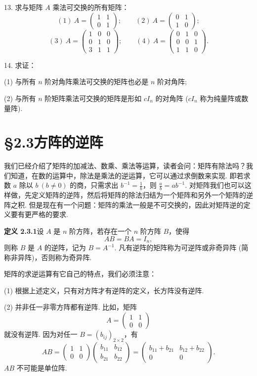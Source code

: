 \documentclass[UTF8, 12pt, fontset=fandol, oneside]{ctexart}
\begin{document}
13. 求与矩阵 $A$ 乘法可交换的所有矩阵：
\[
(1)\ A=\left(\begin{array}{cc}
1 & 1\\
0 & 1
\end{array}\right);
\qquad
(2)\ A=\left(\begin{array}{cc}
0 & 1\\
1 & 0
\end{array}\right);
\]
\[
(3)\ A=\left(\begin{array}{ccc}
1 & 0 & 0\\
0 & 1 & 0\\
3 & 1 & 1
\end{array}\right);
\qquad
(4)\ A=\left(\begin{array}{ccc}
0 & 1 & 0\\
0 & 0 & 1\\
1 & 1 & 0
\end{array}\right).
\]

14. 求证：

(1) 与所有 $n$ 阶对角阵乘法可交换的矩阵也必是 $n$ 阶对角阵;

(2) 与所有 $n$ 阶矩阵乘法可交换的矩阵是形如 $cI_n$ 的对角阵 ($cI_n$ 称为纯量阵或数量阵).

\section*{§2.3\quad 方阵的逆阵}

我们已经介绍了矩阵的加减法、数乘、乘法等运算，读者会问：矩阵有除法吗？我们知道，在数的运算中，除法是乘法的逆运算，它可以通过求倒数来实现. 即若求数 $a$ 除以 $b\ (b\ne 0)$ 的商，只需求出 $b^{-1}=\frac{1}{b}$，则 $\frac{a}{b}=ab^{-1}$. 对矩阵我们也可以这样做，先定义矩阵的逆阵，然后将矩阵的除法归结为一个矩阵和另外一个矩阵的逆阵之积. 但是现在有一个问题：矩阵的乘法一般是不可交换的，因此对矩阵逆的定义要有更严格的要求.

\noindent\textbf{定义 2.3.1}\quad 设 $A$ 是 $n$ 阶方阵，若存在一个 $n$ 阶方阵 $B$，使得
\[
AB=BA=I_n,
\]
则称 $B$ 是 $A$ 的逆阵，记为 $B=A^{-1}$. 凡有逆阵的矩阵称为可逆阵或非奇异阵 (简称非异阵)，否则称为奇异阵.

矩阵的求逆运算有它自己的特点，我们必须注意：

(1) 根据上述定义，只有对方阵才有逆阵的定义，长方阵没有逆阵.

(2) 并非任一非零方阵都有逆阵. 比如，矩阵
\[
A=\left(\begin{array}{cc}
1 & 1\\
0 & 0
\end{array}\right)
\]
就没有逆阵. 因为对任一 $B=(b_{ij})_{2\times 2}$，有
\[
AB=\left(\begin{array}{cc}
1 & 1\\
0 & 0
\end{array}\right)
\left(\begin{array}{cc}
b_{11} & b_{12}\\
b_{21} & b_{22}
\end{array}\right)
=
\left(\begin{array}{cc}
b_{11}+b_{21} & b_{12}+b_{22}\\
0 & 0
\end{array}\right).
\]
$AB$ 不可能是单位阵.
\end{document}
